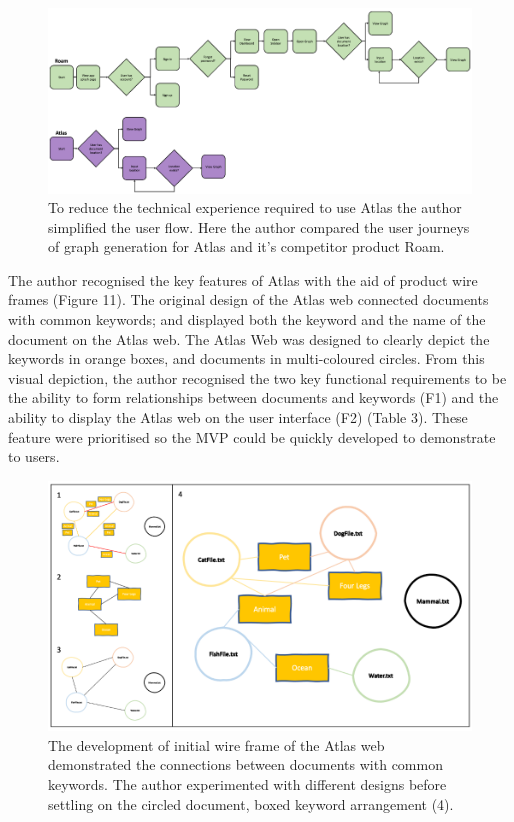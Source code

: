 \documentclass{article}
\begin{document}
\begin{figure}[!htb]
  \centering
      \includegraphics[width=1\textwidth]{images/userflow.png}
  \caption{To reduce the technical experience required to use Atlas the author simplified the user flow. Here the author compared the user journeys of graph generation for Atlas and it's competitor product Roam.}
\end{figure}

The author recognised the key features of Atlas with the aid of product wire frames (Figure 11). The original design of the Atlas web connected documents with common keywords; and displayed both the keyword and the name of the document on the Atlas web. The Atlas Web was designed to clearly depict the keywords in orange boxes, and documents in multi-coloured circles. From this visual depiction, the author recognised the two key functional requirements to be the ability to form relationships between documents and keywords (F1) and the ability to display the Atlas web on the user interface (F2) (Table 3). These feature were prioritised so the MVP could be quickly developed to demonstrate to users.

\begin{figure}[!htb]
  \centering
      \includegraphics[width=1\textwidth]{images/wireframe.png}
  \caption{The development of initial wire frame of the Atlas web demonstrated the connections between documents with common keywords. The author experimented with different designs before settling on the circled document, boxed keyword arrangement (4).}
\end{figure}
\end{document}
